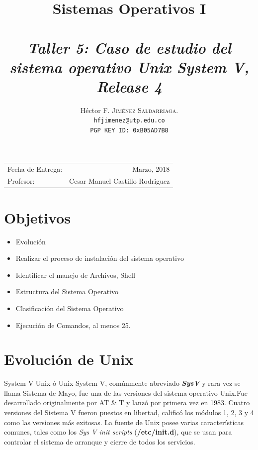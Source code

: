 \documentclass[paper=a4, fontsize=12pt]{article}        %
\title{Sistemas Operativos I\\ 
\horrule{0.5pt} \\[0.4cm]                               %
\textit{Taller 5: Caso de estudio del sistema operativo Unix System V, Release 4}
\horrule{1pt} \\[0.5cm]             
}
\author{                                                
Héctor F. \textsc{Jiménez Saldarriaga.}\\               %
\texttt{hfjimenez@utp.edu.co} \\                        
\texttt{PGP KEY ID: 0xB05AD7B8}
}
\date{}                                                %
\numberwithin{equation}{section}                        %
\numberwithin{table}{section}                           %
\begin{document}
\maketitle                                             %
\begin{center}
\begin{tabular}{l r}                                   %
Fecha de Entrega: & Marzo, 2018 \\                 %
Profesor: & Cesar Manuel Castillo Rodriguez
\end{tabular}
\end{center}
\section{Objetivos}
\begin{itemize}
    \item Evolución
    \item Realizar el proceso de instalación del sistema operativo  
    \item Identificar el manejo de Archivos, Shell
    \item Estructura del Sistema Operativo
    \item Clasificación del Sistema Operativo
    \item Ejecución de Comandos, al menos 25.
\end{itemize}
\section{Evolución de Unix} 
System V Unix ó Unix System V, comúnmente abreviado \textbf{\textit{SysV}} y rara vez se llama Sistema de Mayo, fue una de las versiones del sistema operativo Unix.Fue desarrollado originalmente por AT \& T y lanzó por primera vez en 1983.  Cuatro versiones del Sistema V fueron puestos en libertad, calificó los módulos 1, 2, 3 y 4 como las versiones más exitosas. La fuente de Unix posee varias características comunes, tales como los \textit{Sys V init scripts} (\textbf{/etc/init.d}), que se usan para controlar el sistema de arranque y cierre de todos los servicios.
\end{document}
